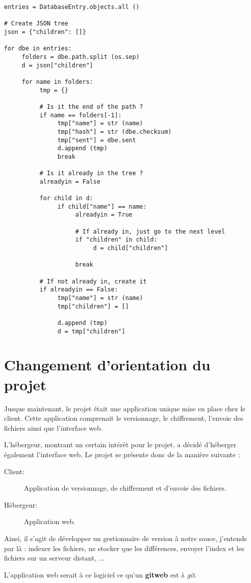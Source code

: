 \begin{verbatim}
entries = DatabaseEntry.objects.all ()

# Create JSON tree
json = {"children": []}

for dbe in entries:
     folders = dbe.path.split (os.sep)
     d = json["children"]

     for name in folders:
          tmp = {}

          # Is it the end of the path ?
          if name == folders[-1]:
               tmp["name"] = str (name)
               tmp["hash"] = str (dbe.checksum)
               tmp["sent"] = dbe.sent
               d.append (tmp)
               break

          # Is it already in the tree ?
          alreadyin = False

          for child in d:
               if child["name"] == name:
                    alreadyin = True

                    # If already in, just go to the next level
                    if "children" in child:
                         d = child["children"]

                    break

          # If not already in, create it
          if alreadyin == False:
               tmp["name"] = str (name)
               tmp["children"] = []

               d.append (tmp)
               d = tmp["children"]
\end{verbatim}

\section{Changement d'orientation du projet}

Jusque maintenant, le projet était une application unique mise en place chez le client.
Cette application comprenait le versionnage, le chiffrement, l'envoie des fichiers ainsi
que l'interface web.

L'hébergeur, montrant un certain intérêt pour le projet, a décidé d'héberger également
l'interface web. Le projet se présente donc de la manière suivante :

\begin{description}
     \item[Client:] Application de versionnage, de chiffrement et d'envoie des fichiers.
     \item[Hébergeur:] Application web.
\end{description}

Ainsi, il s'agit de développer un gestionnaire de version à notre sauce, j'entends par là :
indexer les fichiers, ne stocker que les différences, envoyer l'index et les fichiers sur un
serveur distant, ...

L'application web serait à ce logiciel ce qu'un \textbf{gitweb} est à \textit{git}.

